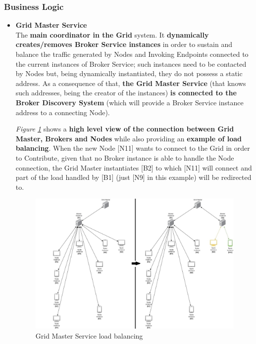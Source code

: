 \subsubsection{Business Logic}
\begin{itemize}
    \item \textbf{Grid Master Service}\\
    The \textbf{main coordinator in the Grid} system. It \textbf{dynamically creates/removes Broker Service instances} in order to sustain and balance the traffic generated by Nodes and Invoking Endpoints connected to the current instances of Broker Service; such instances need to be contacted by Nodes but, being dynamically instantiated, they do not possess a static address. As a consequence of that, \textbf{the Grid Master Service} (that knows such addresses, being the creator of the instances) \textbf{is connected to the Broker Discovery System} (which will provide a Broker Service instance address to a connecting Node).

    \textit{Figure \ref{fig:master_grid_load_balancing}} shows a \textbf{high level view of the connection between Grid Master, Brokers and Nodes} while also providing an \textbf{example of load balancing}. When the new Node [N11] wants to connect to the Grid in order to Contribute, given that no Broker instance is able to handle the Node connection, the Grid Master instantiates [B2] to which [N11] will connect and part of the load handled by [B1] (just [N9] in this example) will be redirected to.
    \begin{figure}[!ht]
        \centering
        \includegraphics[width=\linewidth]{document/chapters/chapter_6/images/master_grid_load_balancing.jpg}
        \caption{Grid Master Service load balancing}
        \label{fig:master_grid_load_balancing}
    \end{figure}


\end{itemize}
